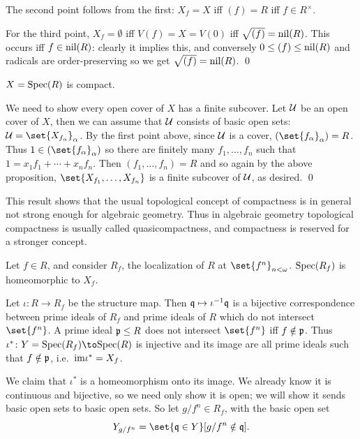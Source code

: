     The second point follows from the first: $X_f=X$ iff $(f)=R$ iff $f\in R^\times$.

    For the third point, $X_f=\emptyset$ iff $V(f)=X=V(0)$ iff $\sqrt{(f)}={\rm nil}(R)$.
    This occurs iff $f\in{\rm nil}(R)$: clearly it implies this, and conversely $0\leq(f)\leq{\rm nil}(R)$ and radicals are order-preserving so we get $\sqrt{(f)}={\rm nil}(R)$.
    \qed

\eproof

\bcoro

    $X={\rm Spec}(R)$ is compact.

\ecoro

\bproof

    We need to show every open cover of $X$ has a finite subcover.
    Let ${{\cal U}}$ be an open cover of $X$, then we can assume that ${{\cal U}}$ consists of basic open sets: $\U=\set{X_{f_\alpha}}_\alpha$.
    By the first point above, since ${{\cal U}}$ is a cover, $(\set{f_\alpha}_\alpha)=R$.
    Thus $1\in(\set{f_\alpha}_\alpha)$ so there are finitely many $f_1,\dots,f_n$ such that $1=x_1f_1+\cdots+x_nf_n$.
    Then $(f_1,\dots,f_n)=R$ and so again by the above proposition, $\set{X_{f_1},\dots,X_{f_n}}$ is a finite subcover of ${{\cal U}}$, as desired.
    \qed

\eproof

\bnote

    This result shows that the usual topological concept of compactness is in general not strong enough for algebraic geometry.
    Thus in algebraic geometry topological compactness is usually called {\emphcolor quasicompactness}, and compactness is reserved for a stronger
    concept.

\enote

\bprop

    Let $f\in R$, and consider $R_f$, the localization of $R$ at $\set{f^n}_{n<\omega}$.
    ${\rm Spec}(R_f)$ is homeomorphic to $X_f$.

\eprop

\bproof

    Let $\iota\colon R\to R_f$ be the structure map.
    Then ${{\frak q}}\mapsto\iota^{-1}{{\frak q}}$ is a bijective correspondence between prime ideals of $R_f$ and prime ideals of $R$ which do not intersect $\set{f^n}$.
    A prime ideal ${{\frak p}}\leq R$ does not intersect $\set{f^n}$ iff $f\notin{{\frak p}}$.
    Thus $\iota^*\colon Y=\spec(R_f)\to\spec(R)$ is injective and its image are all prime ideals such that $f\notin{{\frak p}}$, i.e.\ ${\rm im}\iota^*=X_f$.

    We claim that $\iota^*$ is a homeomorphism onto its image.
    We already know it is continuous and bijective, so we need only show it is open; we will show it sends basic open sets to basic open sets.
    So let $g/f^n\in R_f$, with the basic open set
    $$ Y_{g/f^n} = \set{\q\in Y}[g/f^n\notin\q] . $$

